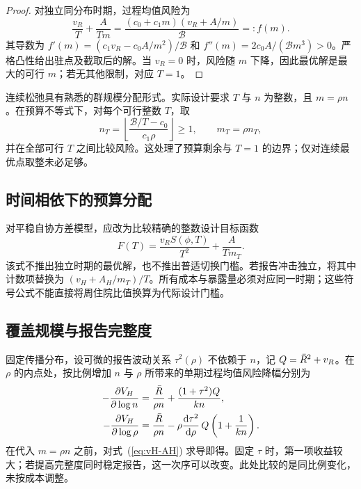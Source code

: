 \begin{proof}
对独立同分布时期，过程均值风险为
\begin{equation}
 \frac{v_R}{T}+\frac{A}{Tm}
 =\frac{(c_0+c_1m)(v_R+A/m)}{\mathcal B}=:f(m).
 \label{eq:alloc-indep}
\end{equation}
其导数为 $f'(m)=(c_1v_R-c_0A/m^2)/\mathcal B$ 和 $f''(m)=2c_0A/(\mathcal B m^3)>0$。严格凸性给出驻点及截取后的解。当 $v_R=0$ 时，风险随 $m$ 下降，因此最优解是最大的可行 $m$；若无其他限制，对应 $T=1$。
\end{proof}

连续松弛具有熟悉的群规模分配形式\citep{cochran1977sampling, raudenbush1997statistical}。实际设计要求 $T$ 与 $n$ 为整数，且 $m=\rho n$。在预算不等式下，对每个可行整数 $T$，取
\begin{equation}
 n_T=\left\lfloor\frac{\mathcal B/T-c_0}{c_1\rho}\right\rfloor\ge1,
 \qquad m_T=\rho n_T,
\end{equation}
并在全部可行 $T$ 之间比较风险。这处理了预算剩余与 $T=1$ 的边界；仅对连续最优点取整未必足够。

\subsection{时间相依下的预算分配}
\label{app:budget-ar}

对平稳自协方差模型，应改为比较精确的整数设计目标函数
\begin{equation}
 F(T)=\frac{v_RS(\phi,T)}{T^2}+\frac{A}{Tm_T}.
 \label{eq:budget-ar-exact}
\end{equation}
该式不推出独立时期的最优解，也不推出普适切换门槛。若报告冲击独立，将其中计数项替换为 $(v_H+A_H/m_T)/T$。所有成本与暴露量必须对应同一时期；这些符号公式不能直接将周住院比值换算为代际设计门槛。

\subsection{覆盖规模与报告完整度}
\label{app:coverage}

固定传播分布，设可微的报告波动关系 $\tau^2(\rho)$ 不依赖于 $n$，记 $Q=\bar R^2+v_R$。在 $\rho$ 的内点处，按比例增加 $n$ 与 $\rho$ 所带来的单期过程均值风险降幅分别为
\begin{equation}
\begin{aligned}
 -\frac{\partial V_H}{\partial\log n}
 &=\frac{\bar R}{\rho n}+\frac{(1+\tau^2)Q}{kn},\\
 -\frac{\partial V_H}{\partial\log\rho}
 &=\frac{\bar R}{\rho n}-\rho\frac{\mathrm d\tau^2}{\mathrm d\rho}\,Q\left(1+\frac{1}{kn}\right).
\end{aligned}
 \label{eq:coverage-gains}
\end{equation}
在代入 $m=\rho n$ 之前，对式~(\ref{eq:vH-AH}) 求导即得。固定 $\tau$ 时，第一项收益较大；若提高完整度同时稳定报告，这一次序可以改变。此处比较的是同比例变化，未按成本调整。

